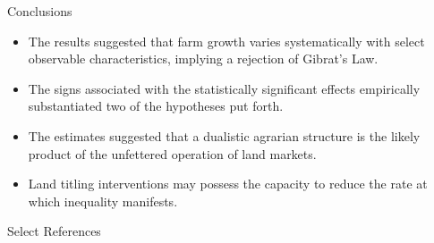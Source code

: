\documentclass[xcolor=dvipsnames]{beamer}
\begin{document}
\begin{frame}{Conclusions}
\begin{itemize}
\item The results suggested that farm growth varies systematically with select 
observable characteristics, implying a rejection of Gibrat's Law.
\par\pause\noindent \item The signs associated with the statistically 
significant effects empirically substantiated two of the hypotheses put forth.
\par\pause\noindent \item The estimates suggested that a dualistic 
agrarian structure is the likely product of the unfettered operation of land 
markets.
\par\pause\noindent \item Land titling interventions may possess the 
capacity to reduce the rate at which inequality manifests.
\end{itemize}
\end{frame}

\begin{frame}{Select References}


\end{frame}
\end{document}
